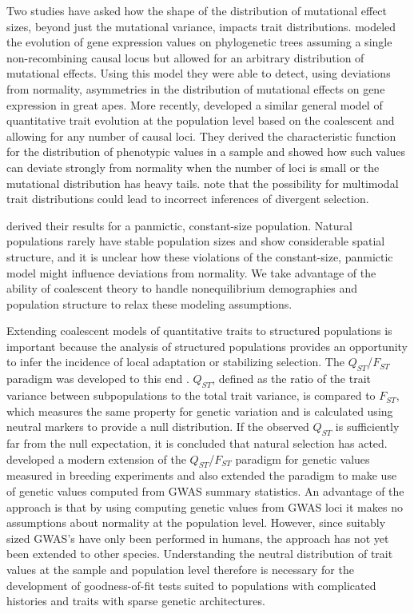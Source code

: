 Two studies have asked how the shape of the distribution of mutational effect
sizes, beyond just the mutational variance, impacts trait
distributions. \citet{Khaitovich2005} modeled the evolution of gene expression
values on phylogenetic trees assuming a single non-recombining causal locus but
allowed for an arbitrary distribution of mutational effects. Using this model
they were able to detect, using deviations from normality, asymmetries in the
distribution of mutational effects on gene expression in great apes. More
recently, \citet{Schraiber2015} developed a similar general model of
quantitative trait evolution at the population level based on the coalescent and
allowing for any number of causal loci. They derived the characteristic function
for the distribution of phenotypic values in a sample and showed how such values
can deviate strongly from normality when the number of loci is small or the
mutational distribution has heavy tails. \citet{Schraiber2015} note that the
possibility for multimodal trait distributions could lead to incorrect
inferences of divergent selection.

\citet{Schraiber2015} derived their results for a panmictic, constant-size
population. Natural populations rarely have stable population sizes and show
considerable spatial structure, and it is unclear how these violations of the
constant-size, panmictic model might influence deviations from normality. We
take advantage of the ability of coalescent theory to handle nonequilibrium
demographies and population structure to relax these modeling assumptions.

Extending coalescent models of quantitative traits to structured populations is
important because the analysis of structured populations provides an opportunity
to infer the incidence of local adaptation or stabilizing selection. The
$Q_{ST}$/$F_{ST}$ paradigm was developed to this end
\citep{Spitze1993,Whitlock2008,Leinonen2013}. $Q_{ST}$, defined as the ratio of the trait
variance between subpopulations to the total trait variance, is compared to
$F_{ST}$, which measures the same property for genetic variation and is
calculated using neutral markers to provide a null distribution. If the observed
$Q_{ST}$ is sufficiently far from the null expectation, it is concluded that
natural selection has acted. \citet{Ovaskainen2011} developed a modern extension
of the $Q_{ST}$/$F_{ST}$ paradigm for genetic values measured in breeding
experiments and \citet{Berg2014} also extended the paradigm to make use of
genetic values computed from GWAS summary statistics. An advantage of the
\citet{Berg2014} approach is that by using computing genetic values from GWAS
loci it makes no assumptions about normality at the population level. However,
since suitably sized GWAS's have only been performed in humans, the approach has
not yet been extended to other species. Understanding the neutral distribution
of trait values at the sample and population level therefore is necessary for
the development of goodness-of-fit tests suited to populations with complicated
histories and traits with sparse genetic architectures.


